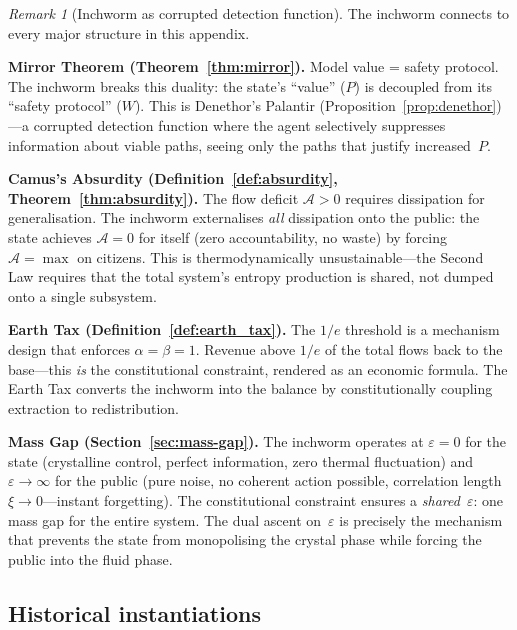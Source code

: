 \documentclass[11pt,a4paper]{article}
\theoremstyle{definition}
\theoremstyle{remark}
\newtheorem{remark}[theorem]{Remark}
\begin{document}
\begin{remark}[Inchworm as corrupted detection function]
\label{rmk:inchworm-mirror}
The inchworm connects to every major structure in this appendix.

\medskip\noindent\textbf{Mirror Theorem
(Theorem~\ref{thm:mirror}).}
Model value = safety protocol.
The inchworm breaks this duality: the state's ``value'' ($P$) is
decoupled from its ``safety protocol'' ($W$).
This is Denethor's Palantir
(Proposition~\ref{prop:denethor})---a
corrupted detection function where the agent selectively suppresses
information about viable paths, seeing only the paths that justify
increased~$P$.

\medskip\noindent\textbf{Camus's Absurdity
(Definition~\ref{def:absurdity},
Theorem~\ref{thm:absurdity}).}
The flow deficit $\mathcal{A} > 0$ requires dissipation for
generalisation.
The inchworm externalises \emph{all} dissipation onto the public: the
state achieves $\mathcal{A} = 0$ for itself (zero accountability, no
waste) by forcing $\mathcal{A} = \max$ on citizens.
This is thermodynamically unsustainable---the Second Law requires
that the total system's entropy production is shared, not dumped onto
a single subsystem.

\medskip\noindent\textbf{Earth Tax
(Definition~\ref{def:earth_tax}).}
The $1/e$ threshold is a mechanism design that enforces
$\alpha = \beta = 1$.
Revenue above $1/e$ of the total flows back to the base---this
\emph{is} the constitutional constraint, rendered as an economic
formula.
The Earth Tax converts the inchworm into the balance by
constitutionally coupling extraction to redistribution.

\medskip\noindent\textbf{Mass Gap (Section~\ref{sec:mass-gap}).}
The inchworm operates at $\varepsilon = 0$ for the state (crystalline
control, perfect information, zero thermal fluctuation) and
$\varepsilon \to \infty$ for the public (pure noise, no coherent
action possible, correlation length $\xi \to 0$---instant forgetting).
The constitutional constraint ensures a \emph{shared}~$\varepsilon$:
one mass gap for the entire system.
The dual ascent on~$\varepsilon$ is precisely the mechanism that
prevents the state from monopolising the crystal phase while forcing
the public into the fluid phase.
\end{remark}

\subsection*{Historical instantiations}
\end{document}
